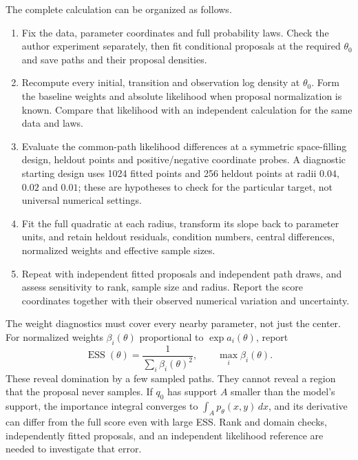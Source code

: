 The complete calculation can be organized as follows.
\begin{enumerate}[label=(\arabic*),leftmargin=0.28in]
  \item Fix the data, parameter coordinates and full probability laws.  Check
  the author experiment separately, then fit conditional proposals at the
  required $\theta_0$ and save paths and their proposal densities.
  \item Recompute every initial, transition and observation log density at
  $\theta_0$.  Form the baseline weights and absolute likelihood when proposal
  normalization is known.  Compare that likelihood with an independent
  calculation for the same data and laws.
  \item Evaluate the common-path likelihood differences at a symmetric
  space-filling design, heldout points and positive/negative coordinate probes.
  A diagnostic starting design uses 1024 fitted points and 256 heldout points
  at radii $0.04$, $0.02$ and $0.01$; these are hypotheses to check for the
  particular target, not universal numerical settings.
  \item Fit the full quadratic at each radius, transform its slope back to
  parameter units, and retain heldout residuals, condition numbers, central
  differences, normalized weights and effective sample sizes.
  \item Repeat with independent fitted proposals and independent path draws,
  and assess sensitivity to rank, sample size and radius.  Report the score
  coordinates together with their observed numerical variation and uncertainty.
\end{enumerate}

The weight diagnostics must cover every nearby parameter, not just the center.
For normalized weights $\beta_i(\theta)$ proportional to
$\exp a_i(\theta)$, report
\begin{equation}
  \operatorname{ESS}(\theta)=\frac{1}{\sum_i\beta_i(\theta)^2},
  \qquad \max_i\beta_i(\theta).
  \label{eq:bf-hd-reference-local-ess}
\end{equation}
These reveal domination by a few sampled paths.  They cannot reveal a region
that the proposal never samples.  If $q_0$ has support $A$ smaller than the
model's support, the importance integral converges to
$\int_Ap_\theta(x,y)\,dx$, and its derivative can differ from the full score
even with large ESS.  Rank and domain checks, independently fitted proposals,
and an independent likelihood reference are needed to investigate that error.

